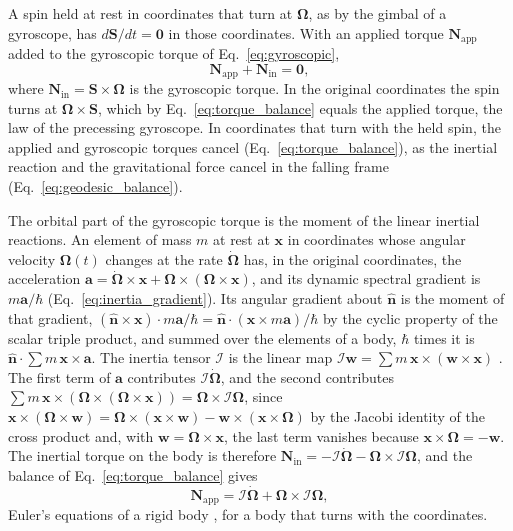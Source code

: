 \documentclass[aps,prd,onecolumn,tightenlines,nofootinbib,notitlepage,11pt,floatfix]{revtex4-2}
\theoremstyle{indentedtheorem}
\begin{document}
A spin held at rest in coordinates that turn at $\boldsymbol{\Omega}$, as by the gimbal of a gyroscope, has $d\mathbf{S}/dt=\mathbf{0}$ in those coordinates. With an applied torque $\mathbf{N}_\text{app}$ \citep{Goldstein2002Classical} added to the gyroscopic torque of Eq.~\eqref{eq:gyroscopic},
\begin{equation}
    \mathbf{N}_\text{app} + \mathbf{N}_\text{in} = \mathbf{0} ,
    \label{eq:torque_balance}
\end{equation}
where $\mathbf{N}_\text{in}=\mathbf{S}\times\boldsymbol{\Omega}$ is the gyroscopic torque. In the original coordinates the spin turns at $\boldsymbol{\Omega}\times\mathbf{S}$, which by Eq.~\eqref{eq:torque_balance} equals the applied torque, the law of the precessing gyroscope. In coordinates that turn with the held spin, the applied and gyroscopic torques cancel (Eq.~\eqref{eq:torque_balance}), as the inertial reaction and the gravitational force cancel in the falling frame (Eq.~\eqref{eq:geodesic_balance}).

The orbital part of the gyroscopic torque is the moment of the linear inertial reactions. An element of mass $m$ at rest at $\mathbf{x}$ in coordinates whose angular velocity $\boldsymbol{\Omega}(t)$ changes at the rate $\dot{\boldsymbol{\Omega}}$ has, in the original coordinates, the acceleration $\mathbf{a}=\dot{\boldsymbol{\Omega}}\times\mathbf{x}+\boldsymbol{\Omega}\times(\boldsymbol{\Omega}\times\mathbf{x})$, and its dynamic spectral gradient is $m\mathbf{a}/\hbar$ (Eq.~\eqref{eq:inertia_gradient}). Its angular gradient about $\hat{\mathbf{n}}$ is the moment of that gradient, $(\hat{\mathbf{n}}\times\mathbf{x})\cdot m\mathbf{a}/\hbar=\hat{\mathbf{n}}\cdot(\mathbf{x}\times m\mathbf{a})/\hbar$ by the cyclic property of the scalar triple product, and summed over the elements of a body, $\hbar$ times it is $\hat{\mathbf{n}}\cdot\sum m\,\mathbf{x}\times\mathbf{a}$. The inertia tensor $\mathcal{I}$ is the linear map $\mathcal{I}\mathbf{w}=\sum m\,\mathbf{x}\times(\mathbf{w}\times\mathbf{x})$ \citep{Goldstein2002Classical}. The first term of $\mathbf{a}$ contributes $\mathcal{I}\dot{\boldsymbol{\Omega}}$, and the second contributes $\sum m\,\mathbf{x}\times(\boldsymbol{\Omega}\times(\boldsymbol{\Omega}\times\mathbf{x}))=\boldsymbol{\Omega}\times\mathcal{I}\boldsymbol{\Omega}$, since $\mathbf{x}\times(\boldsymbol{\Omega}\times\mathbf{w})=\boldsymbol{\Omega}\times(\mathbf{x}\times\mathbf{w})-\mathbf{w}\times(\mathbf{x}\times\boldsymbol{\Omega})$ by the Jacobi identity of the cross product and, with $\mathbf{w}=\boldsymbol{\Omega}\times\mathbf{x}$, the last term vanishes because $\mathbf{x}\times\boldsymbol{\Omega}=-\mathbf{w}$. The inertial torque on the body is therefore $\mathbf{N}_\text{in}=-\mathcal{I}\dot{\boldsymbol{\Omega}}-\boldsymbol{\Omega}\times\mathcal{I}\boldsymbol{\Omega}$, and the balance of Eq.~\eqref{eq:torque_balance} gives
\begin{equation}
    \mathbf{N}_\text{app} = \mathcal{I}\dot{\boldsymbol{\Omega}} + \boldsymbol{\Omega}\times\mathcal{I}\boldsymbol{\Omega} ,
    \label{eq:euler_rigid}
\end{equation}
Euler's equations of a rigid body \citep{Goldstein2002Classical}, for a body that turns with the coordinates.
\end{document}
